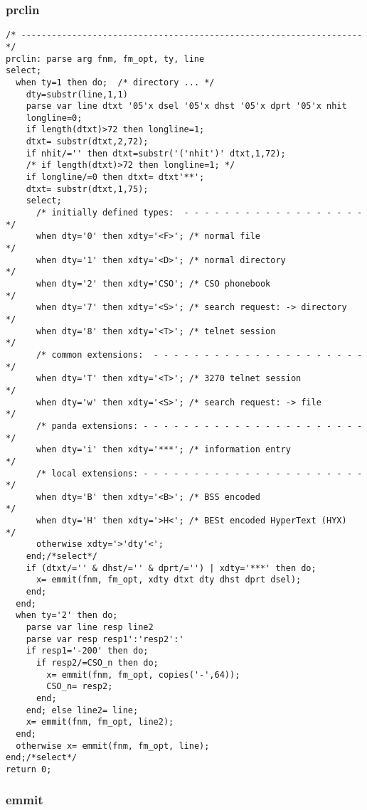 \subsubsection{prclin}

\def\LPtopF{prclin}

\begin{verbatim}
/* ------------------------------------------------------------------- */
prclin: parse arg fnm, fm_opt, ty, line
select;
  when ty=1 then do;  /* directory ... */
    dty=substr(line,1,1)
    parse var line dtxt '05'x dsel '05'x dhst '05'x dprt '05'x nhit
    longline=0;
    if length(dtxt)>72 then longline=1;
    dtxt= substr(dtxt,2,72);
    if nhit/='' then dtxt=substr('('nhit')' dtxt,1,72);
    /* if length(dtxt)>72 then longline=1; */
    if longline/=0 then dtxt= dtxt'**';
    dtxt= substr(dtxt,1,75);
    select;
      /* initially defined types:  - - - - - - - - - - - - - - - - - - */
      when dty='0' then xdty='<F>'; /* normal file                     */
      when dty='1' then xdty='<D>'; /* normal directory                */
      when dty='2' then xdty='CSO'; /* CSO phonebook                   */
      when dty='7' then xdty='<S>'; /* search request: -> directory    */
      when dty='8' then xdty='<T>'; /* telnet session                  */
      /* common extensions:  - - - - - - - - - - - - - - - - - - - - - */
      when dty='T' then xdty='<T>'; /* 3270 telnet session             */
      when dty='w' then xdty='<S>'; /* search request: -> file         */
      /* panda extensions: - - - - - - - - - - - - - - - - - - - - - - */
      when dty='i' then xdty='***'; /* information entry               */
      /* local extensions: - - - - - - - - - - - - - - - - - - - - - - */
      when dty='B' then xdty='<B>'; /* BSS encoded                     */
      when dty='H' then xdty='>H<'; /* BESt encoded HyperText (HYX)    */
      otherwise xdty='>'dty'<';
    end;/*select*/
    if (dtxt/='' & dhst/='' & dprt/='') | xdty='***' then do;
      x= emmit(fnm, fm_opt, xdty dtxt dty dhst dprt dsel);
    end;
  end;
  when ty='2' then do;
    parse var line resp line2
    parse var resp resp1':'resp2':'
    if resp1='-200' then do;
      if resp2/=CSO_n then do;
        x= emmit(fnm, fm_opt, copies('-',64));
        CSO_n= resp2;
      end;
    end; else line2= line;
    x= emmit(fnm, fm_opt, line2);
  end;
  otherwise x= emmit(fnm, fm_opt, line);
end;/*select*/
return 0; 
\end{verbatim}

\subsubsection{emmit}

